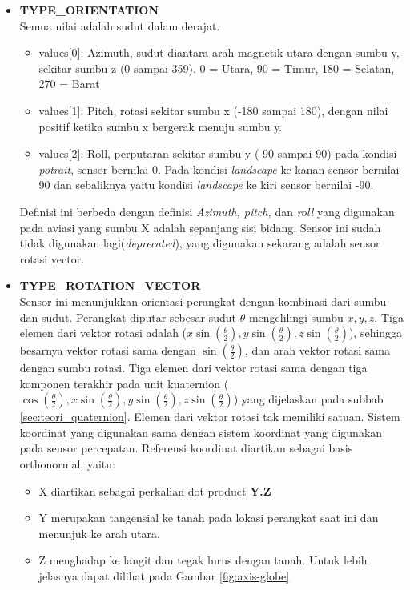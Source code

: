\begin{itemize}
\item \textbf{TYPE\_ORIENTATION}\\
Semua nilai adalah sudut dalam derajat.
\begin{itemize}
	\item values[0]: Azimuth, sudut diantara arah magnetik utara dengan sumbu y, sekitar sumbu z (0 sampai 359). 0 = Utara, 90 = Timur, 180 = Selatan, 270 = Barat
	\item values[1]: Pitch, rotasi sekitar sumbu x (-180 sampai 180), dengan nilai positif ketika sumbu x bergerak menuju sumbu y.
	\item values[2]: Roll, perputaran sekitar sumbu y (-90 sampai 90) pada kondisi \textit{potrait}, sensor bernilai 0. Pada kondisi \textit{landscape} ke kanan sensor bernilai 90 dan sebaliknya yaitu kondisi \textit{landscape} ke kiri sensor bernilai -90.
\end{itemize}
Definisi ini berbeda dengan definisi \textit{Azimuth, pitch,} dan \textit{roll} yang digunakan pada aviasi yang sumbu X adalah sepanjang sisi bidang. Sensor ini sudah tidak digunakan lagi(\textit{deprecated}), yang digunakan sekarang adalah sensor rotasi vector.\\
\item \textbf{TYPE\_ROTATION\_VECTOR}\\
Sensor ini menunjukkan orientasi perangkat dengan kombinasi dari sumbu dan sudut. Perangkat diputar sebesar sudut \(\theta\) mengelilingi sumbu \(x,y,z\). Tiga elemen dari vektor rotasi adalah (\(x \sin (\frac{\theta}{2}), y \sin (\frac{\theta}{2}), z \sin (\frac{\theta}{2})\)), sehingga besarnya vektor rotasi sama dengan \(\sin (\frac{\theta}{2})\), dan arah vektor rotasi sama dengan sumbu rotasi. Tiga elemen dari vektor rotasi sama dengan tiga komponen terakhir pada unit kuaternion (\(\cos (\frac{\theta}{2}),x \sin (\frac{\theta}{2}), y \sin (\frac{\theta}{2}), z \sin (\frac{\theta}{2})\)) yang dijelaskan pada subbab \ref{sec:teori_quaternion}. Elemen dari vektor rotasi tak memiliki satuan. Sistem koordinat yang digunakan sama dengan sistem koordinat yang digunakan pada sensor percepatan. Referensi koordinat diartikan sebagai basis orthonormal, yaitu:
\begin{itemize}
	\item X diartikan sebagai perkalian dot product \textbf{Y.Z}
	\item Y merupakan tangensial ke tanah pada lokasi perangkat saat ini dan menunjuk ke arah utara. 
	\item Z menghadap ke langit dan tegak lurus dengan tanah. Untuk lebih jelasnya dapat dilihat pada Gambar \ref{fig:axis-globe}

\end{itemize}
\end{itemize}
